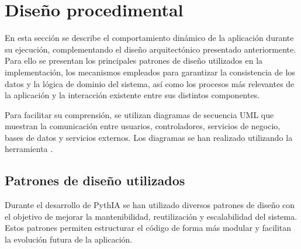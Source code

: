 \section{Diseño procedimental} \label{dis:proc}

En esta sección se describe el comportamiento dinámico de la aplicación durante su ejecución, complementando el diseño arquitectónico presentado anteriormente. Para ello se presentan los principales patrones de diseño utilizados en la implementación, los mecanismos empleados para garantizar la consistencia de los datos y la lógica de dominio del sistema, así como los procesos más relevantes de la aplicación y la interacción existente entre sus distintos componentes.

Para facilitar su comprensión, se utilizan diagramas de secuencia UML que muestran la comunicación entre usuarios, controladores, servicios de negocio, bases de datos y servicios externos. Los diagramas se han realizado utilizando la herramienta .

\subsection{Patrones de diseño utilizados}

Durante el desarrollo de PythIA se han utilizado diversos patrones de diseño con el objetivo de mejorar la mantenibilidad, reutilización y escalabilidad del sistema. Estos patrones permiten estructurar el código de forma más modular y facilitan la evolución futura de la aplicación.

